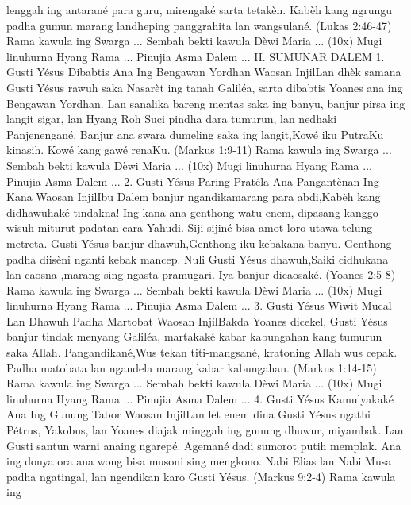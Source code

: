 \documentclass{scrbook}
\begin{document}
lenggah ing antaran\'e para guru, mirengak\'e sarta tetak\`en. Kab\`eh
kang ngrungu padha gumun marang landheping panggrahita lan
wangsulan\'e. (Lukas 2:46-47) {\dag} Rama kawula ing Swarga ... {\dag}
Sembah bekti kawula D\`ewi Maria ... (10x) {\dag} Mugi linuhurna Hyang
Rama ... {\dag} Pinujia Asma Dalem ...  II. SUMUNAR DALEM 1. Gusti
Y\'esus Dibabtis Ana Ing Bengawan Yordhan Waosan InjilLan dh\`ek samana
Gusti Y\'esus rawuh saka Nasar\`et ing tanah Galil\'ea, sarta dibabtis
Yoanes ana ing Bengawan Yordhan. Lan sanalika bareng mentas saka ing
banyu, banjur pirsa ing langit sigar, lan Hyang Roh Suci pindha dara
tumurun, lan nedhaki Panjenengan\'e. Banjur ana swara dumeling saka ing
langit,{\textquotedbl}Kow\'e iku PutraKu kinasih. Kow\'e kang gaw\'e
renaKu.{\textquotedbl} (Markus 1:9-11) {\dag} Rama kawula ing Swarga
... {\dag} Sembah bekti kawula D\`ewi Maria ... (10x) {\dag} Mugi
linuhurna Hyang Rama ... {\dag} Pinujia Asma Dalem ...  2. Gusti
Y\'esus Paring Prat\'ela Ana Pangant\`enan Ing Kana Waosan InjilIbu
Dalem banjur ngandikamarang para abdi,{\textquotedbl}Kab\`eh kang
didhawuhak\'e tindakna!{\textquotedbl} Ing kana ana genthong watu enem,
dipasang kanggo wisuh miturut padatan cara Yahudi. Siji-sijin\'e bisa
amot loro utawa telung metreta. Gusti Y\'esus banjur
dhawuh,{\textquotedbl}Genthong iku kebakana banyu.{\textquotedbl}
Genthong padha diis\`eni nganti kebak mancep. Nuli Gusti Y\'esus
dhawuh,{\textquotedbl}Saiki cidhukana lan caosna ,marang sing ngasta
pramugari.{\textquotedbl} Iya banjur dicaosak\'e. (Yoanes 2:5-8) {\dag}
Rama kawula ing Swarga ... {\dag} Sembah bekti kawula D\`ewi Maria ...
(10x) {\dag} Mugi linuhurna Hyang Rama ... {\dag} Pinujia Asma Dalem
...  3. Gusti Y\'esus Wiwit Mucal Lan Dhawuh Padha Martobat Waosan
InjilBakda Yoanes dicekel, Gusti Y\'esus banjur tindak menyang
Galil\'ea, martakak\'e kabar kabungahan kang tumurun saka Allah.
Pangandikan\'e,{\textquotedbl}Wus tekan titi-mangsan\'e, kratoning
Allah wus cepak. Padha matobata lan ngandela marang kabar
kabungahan.{\textquotedbl} (Markus 1:14-15) {\dag} Rama kawula ing
Swarga ... {\dag} Sembah bekti kawula D\`ewi Maria ... (10x) {\dag}
Mugi linuhurna Hyang Rama ... {\dag} Pinujia Asma Dalem ...  4. Gusti
Y\'esus Kamulyakak\'e Ana Ing Gunung Tabor Waosan InjilLan let enem
dina Gusti Y\'esus ngathi P\'etrus, Yakobus, lan Yoanes diajak minggah
ing gunung dhuwur, miyambak. Lan Gusti santun warni anaing ngarep\'e.
Ageman\'e dadi sumorot putih memplak. Ana ing donya ora ana wong bisa
musoni sing mengkono. Nabi Elias lan Nabi Musa padha ngatingal, lan
ngendikan karo Gusti Y\'esus. (Markus 9:2-4) {\dag} Rama kawula ing
\end{document}
